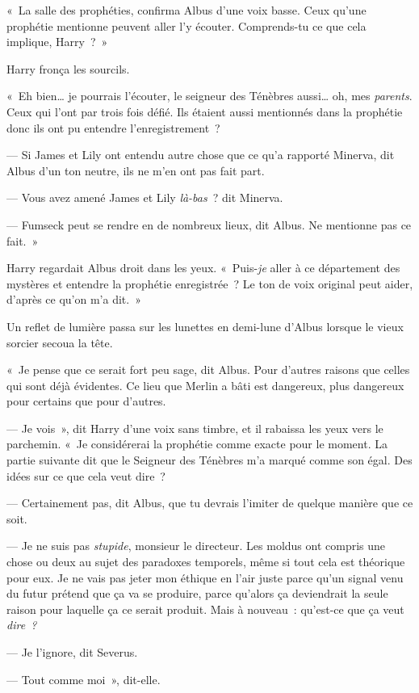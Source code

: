 «~La salle des prophéties, confirma Albus d'une voix basse. Ceux qu'une prophétie mentionne peuvent aller l'y écouter. Comprends-tu ce que cela implique, Harry~?~»

Harry fronça les sourcils.

«~Eh bien… je pourrais l'écouter, le seigneur des Ténèbres aussi… oh, mes \emph{parents}. Ceux qui l'ont par trois fois défié. Ils étaient aussi mentionnés dans la prophétie donc ils ont pu entendre l'enregistrement~?

--- Si James et Lily ont entendu autre chose que ce qu'a rapporté Minerva, dit Albus d'un ton neutre, ils ne m'en ont pas fait part.

--- Vous avez amené James et Lily \emph{là-bas}~? dit Minerva.

--- Fumseck peut se rendre en de nombreux lieux, dit Albus. Ne mentionne pas ce fait.~»

Harry regardait Albus droit dans les yeux. «~Puis-\emph{je} aller à ce département des mystères et entendre la prophétie enregistrée~? Le ton de voix original peut aider, d'après ce qu'on m'a dit.~»

Un reflet de lumière passa sur les lunettes en demi-lune d'Albus lorsque le vieux sorcier secoua la tête.

«~Je pense que ce serait fort peu sage, dit Albus. Pour d'autres raisons que celles qui sont déjà évidentes. Ce lieu que Merlin a bâti est dangereux, plus dangereux pour certains que pour d'autres.

--- Je vois~», dit Harry d'une voix sans timbre, et il rabaissa les yeux vers le parchemin. «~Je considérerai la prophétie comme exacte pour le moment. La partie suivante dit que le Seigneur des Ténèbres m'a marqué comme son égal. Des idées sur ce que cela veut dire~?

--- Certainement pas, dit Albus, que tu devrais l'imiter de quelque manière que ce soit.

--- Je ne suis pas \emph{stupide}, monsieur le directeur. Les moldus ont compris une chose ou deux au sujet des paradoxes temporels, même si tout cela est théorique pour eux. Je ne vais pas jeter mon éthique en l'air juste parce qu'un signal venu du futur prétend que ça va se produire, parce qu'alors ça deviendrait la seule raison pour laquelle ça ce serait produit. Mais à nouveau~: qu'est-ce que ça veut \emph{dire~?}

--- Je l'ignore, dit Severus.

--- Tout comme moi~», dit-elle.

